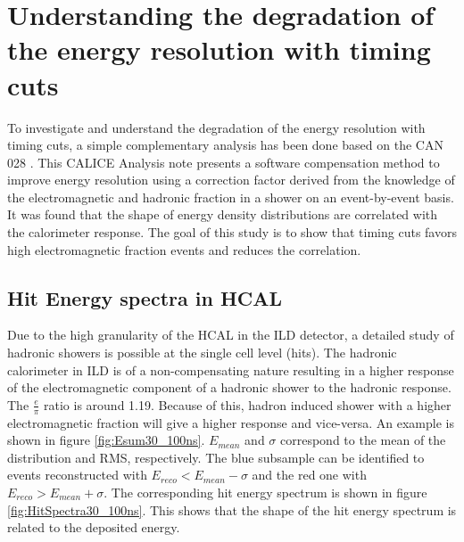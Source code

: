 \chapter{Understanding the degradation of the energy resolution with timing cuts}
\label{appendix:eresdegrad}

To investigate and understand the degradation of the energy resolution with timing cuts, a simple complementary analysis has been done based on the CAN 028 \cite{CaN028}. This CALICE Analysis note presents a software compensation method to improve energy resolution using a correction factor derived from the knowledge of the electromagnetic and hadronic fraction in a shower on an event-by-event basis. It was found that the shape of energy density distributions are correlated with the calorimeter response. The goal of this study is to show that timing cuts favors high electromagnetic fraction events and reduces the correlation.

\section{Hit Energy spectra in HCAL}

Due to the high granularity of the HCAL in the ILD detector, a detailed study of hadronic showers is possible at the single cell level (hits). The hadronic calorimeter in ILD is of a non-compensating nature resulting in a higher response of the electromagnetic component of a hadronic shower to the hadronic response. The $\frac{e}{\pi}$ ratio is around 1.19. Because of this, hadron induced shower with a higher electromagnetic fraction will give a higher response and vice-versa. An example is shown in figure \ref{fig:Esum30_100ns}. $E_{mean}$ and $\sigma$ correspond to the mean of the distribution and RMS, respectively. The blue subsample can be identified to events reconstructed with $E_{reco} < E_{mean} - \sigma$ and the red one with $E_{reco} > E_{mean} + \sigma$. The corresponding hit energy spectrum is shown in figure \ref{fig:HitSpectra30_100ns}. This shows that the shape of the hit energy spectrum is related to the deposited energy.

